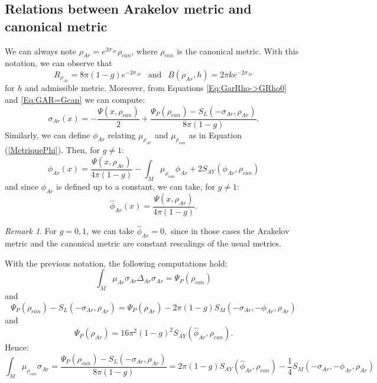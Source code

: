 \documentclass{article}
\theoremstyle{definition}
\theoremstyle{remark}
\newtheorem{Remark}[theorem]{Remark}
\begin{document}
\subsection{Relations between Arakelov metric and canonical metric}\label{Section:ArakelovCanonical}
We can always note $\rho_{Ar}=e^{2\sigma_{Ar}}\rho_{can}$, where $\rho_{can}$ is the canonical metric. With this notation, we can observe that $$R_{\rho_{Ar}}=8\pi(1-g)e^{-2\sigma_{Ar}} ~~ \text{ and } ~~ B(\rho_{Ar},h)=2\pi k e^{-2\sigma_{Ar}}$$ for $h$ and admissible metric. 
Moreover, from Equations \eqref{Eq:GarRho->GRho0} and \eqref{Eq:GAR=Gcan} we can compute: $$\sigma_{Ar}(x)=-\frac{\Psi(x,\rho_{can})}{2}+\frac{\Psi_{P}(\rho_{can})-S_{L}(-\sigma_{Ar},\rho_{Ar})}{8\pi(1-g)}.$$
Similarly, we can define $\phi_{Ar}$ relating $\mu_{\rho_{Ar}}$ and $\mu_{\rho_{can}}$ as in Equation (\ref{MetriquePhi}). Then, for $g\neq1$: $$\phi_{Ar}(x)=\frac{\Psi(x,\rho_{Ar})}{4\pi(1-g)}-\int_{M}\mu_{\rho_{can}}\phi_{Ar}+2S_{AY}(\phi_{Ar},\rho_{can})$$ and since $\phi_{Ar}$ is defined up to a constant, we can take, for $g\neq1$: \begin{equation}\label{PhiHat}\hat{\phi}_{Ar}(x)=\frac{\Psi(x,\rho_{Ar})}{4\pi(1-g)}.\end{equation}
\begin{Remark}
    For $g=0,1$, we can take $\hat{\phi}_{Ar}=0,$ since in those cases the Arakelov metric and the canonical metric are constant rescalings of the usual metrics.
\end{Remark}
With the previous notation, the following computations hold: 
\begin{equation}\label{Eq:IntSigmaArDelta-PsiP}\int_{M} \mu_{Ar} \sigma_{Ar} \Delta_{Ar} \sigma_{Ar}=\Psi_{P}(\rho_{can})\end{equation} and $$\Psi_{P}(\rho_{can})-S_{L}(-\sigma_{Ar},\rho_{Ar})=\Psi_{P}(\rho_{Ar})-2\pi(1-g)S_{M}(-\sigma_{Ar},-\phi_{Ar},\rho_{Ar})$$ and $$\Psi_{P}(\rho_{Ar})=16\pi^{2}(1-g)^{2}S_{AY}(\hat{\phi}_{Ar},\rho_{can}).$$ Hence: \begin{equation}\label{Eq:IntSigmaAr-PsiP-SAY}\int_{M} \mu_{\rho_{can}}\sigma_{Ar}=\frac{\Psi_{P}(\rho_{can})-S_{L}(-\sigma_{Ar},\rho_{Ar})}{8\pi(1-g)}=2\pi(1-g)S_{AY}(\hat{\phi}_{Ar},\rho_{can})-\frac{1}{4}S_{M}(-\sigma_{Ar},-\phi_{Ar},\rho_{Ar})\end{equation}
\end{document}
